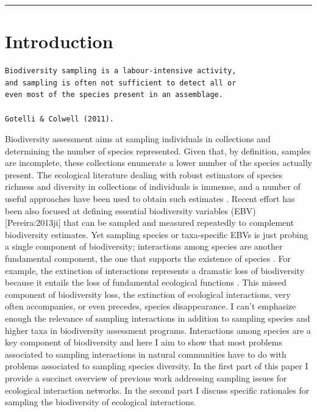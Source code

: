 \documentclass[a4paper,12pt]{article}
\begin{document}
\begin{spacing}{1.0}
\begin{center}\rule{3in}{0.4pt}\end{center}


\chapter{Introduction}
\label{introduction}

\begin{verbatim}
Biodiversity sampling is a labour-intensive activity,   
and sampling is often not sufficient to detect all or   
even most of the species present in an assemblage.   

Gotelli & Colwell (2011).
\end{verbatim}

Biodiversity assessment aims at sampling individuals in collections and determining the number of species represented. Given that, by definition, samples are incomplete, these collections enumerate a lower number of the species actually present. The ecological literature dealing with robust estimators of species richness and diversity in collections of individuals is immense, and a number of useful approaches have been used to obtain such estimates \citep{Magurran:1988mm}\citep{Gotelli:2001uo}\citep{Hortal:2006dc}\citep{Gotelli:2011tb}. Recent effort has been also focused at defining essential biodiversity variables (EBV) [Pereira:2013ji] that can be sampled and measured repeatedly to complement biodiversity estimates. Yet sampling species or taxa-specific EBVs is just probing a single component of biodiversity; interactions among species are another fundamental component, the one that supports the existence of species \citep{Memmott:2006vy}. For example, the extinction of interactions represents a dramatic loss of biodiversity because it entails the loss of fundamental ecological functions \citep{ValienteBanuet:2014bw}. This missed component of biodiversity loss, the extinction of ecological interactions, very often accompanies, or even precedes, species disappearance. I can't emphasize enough the relevance of sampling interactions in addition to sampling species and higher taxa in biodiversity assessment programs. Interactions among species are a key component of biodiversity and here I aim to show that most problems associated to sampling interactions in natural communities have to do with problems associated to sampling species diversity. In the first part of this paper I provide a succinct overview of previous work addressing sampling issues for ecological interaction networks. In the second part I discuss specific rationales for sampling the biodiversity of ecological interactions.

\end{spacing}
\end{document}
